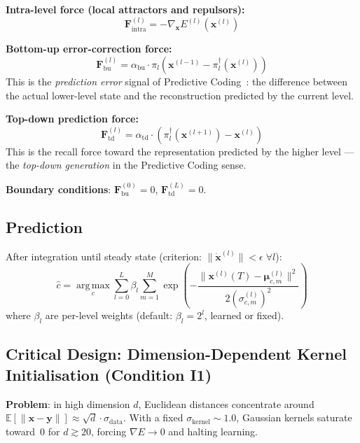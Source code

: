 \documentclass[11pt,a4paper]{article}
\begin{document}
\medskip
\textbf{Intra-level force (local attractors and repulsors):}
\begin{equation}
  \mathbf{F}^{(l)}_{\mathrm{intra}} = -\nabla_{\mathbf{x}} E^{(l)}(\mathbf{x}^{(l)})
\end{equation}

\textbf{Bottom-up error-correction force:}
\begin{equation}
  \mathbf{F}^{(l)}_{\mathrm{bu}} =
  \alpha_{\mathrm{bu}} \cdot \pi_l\!\left(
    \mathbf{x}^{(l-1)} - \pi_l^\dagger(\mathbf{x}^{(l)})
  \right)
\end{equation}
This is the \emph{prediction error} signal of Predictive Coding~\cite{rao1999predictive}:
the difference between the actual lower-level state and the reconstruction predicted by
the current level.

\textbf{Top-down prediction force:}
\begin{equation}
  \mathbf{F}^{(l)}_{\mathrm{td}} =
  \alpha_{\mathrm{td}} \cdot \left(
    \pi_l^\dagger\!\left(\mathbf{x}^{(l+1)}\right) - \mathbf{x}^{(l)}
  \right)
\end{equation}
This is the recall force toward the representation predicted by the higher level --- the
\emph{top-down generation} in the Predictive Coding sense.

\textbf{Boundary conditions}: $\mathbf{F}^{(0)}_{\mathrm{bu}} = 0$,
$\mathbf{F}^{(L)}_{\mathrm{td}} = 0$.

\subsection{Prediction}

After integration until steady state (criterion: $\|\dot{\mathbf{x}}^{(l)}\| < \epsilon\;\forall l$):
\begin{equation}
  \hat{c} = \operatorname*{arg\,max}_c \sum_{l=0}^{L} \beta_l \sum_{m=1}^{M}
    \exp\!\left(-\frac{\|\mathbf{x}^{(l)}(T) - \boldsymbol{\mu}^{(l)}_{c,m}\|^2}
                      {2(\sigma^{(l)}_{c,m})^2}\right)
\end{equation}
where $\beta_l$ are per-level weights (default: $\beta_l = 2^l$, learned or fixed).

\subsection{Critical Design: Dimension-Dependent Kernel Initialisation (Condition I1)}

\textbf{Problem}: in high dimension $d$, Euclidean distances concentrate around
$\mathbb{E}[\|\mathbf{x}-\mathbf{y}\|] \approx \sqrt{d}\cdot\sigma_{\mathrm{data}}$.
With a fixed $\sigma_{\mathrm{kernel}} \sim 1.0$, Gaussian kernels saturate toward~0 for
$d \gtrsim 20$, forcing $\nabla E \to 0$ and halting learning.
\end{document}
